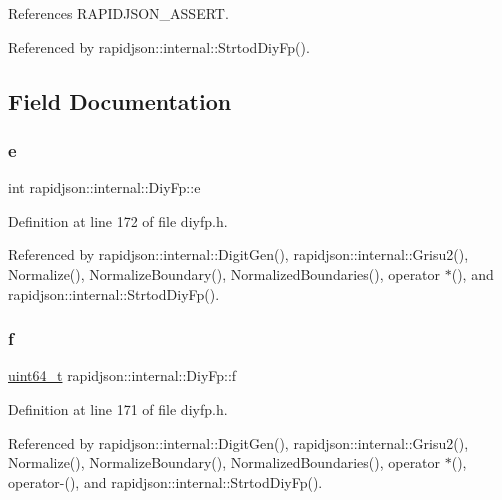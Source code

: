 References R\+A\+P\+I\+D\+J\+S\+O\+N\+\_\+\+A\+S\+S\+E\+RT.



Referenced by rapidjson\+::internal\+::\+Strtod\+Diy\+Fp().



\subsection{Field Documentation}
\mbox{\label{structrapidjson_1_1internal_1_1_diy_fp_adb29b66d68cb2675c06deda434bfcafb}} 
\subsubsection{\texorpdfstring{e}{e}}
{\footnotesize\ttfamily int rapidjson\+::internal\+::\+Diy\+Fp\+::e}



Definition at line 172 of file diyfp.\+h.



Referenced by rapidjson\+::internal\+::\+Digit\+Gen(), rapidjson\+::internal\+::\+Grisu2(), Normalize(), Normalize\+Boundary(), Normalized\+Boundaries(), operator $\ast$(), and rapidjson\+::internal\+::\+Strtod\+Diy\+Fp().

\mbox{\label{structrapidjson_1_1internal_1_1_diy_fp_a4d69f9f4281512c960c8bdfe9b528cdf}} 
\subsubsection{\texorpdfstring{f}{f}}
{\footnotesize\ttfamily \mbox{\hyperlink{stdint_8h_aec6fcb673ff035718c238c8c9d544c47}{uint64\+\_\+t}} rapidjson\+::internal\+::\+Diy\+Fp\+::f}



Definition at line 171 of file diyfp.\+h.



Referenced by rapidjson\+::internal\+::\+Digit\+Gen(), rapidjson\+::internal\+::\+Grisu2(), Normalize(), Normalize\+Boundary(), Normalized\+Boundaries(), operator $\ast$(), operator-\/(), and rapidjson\+::internal\+::\+Strtod\+Diy\+Fp().


